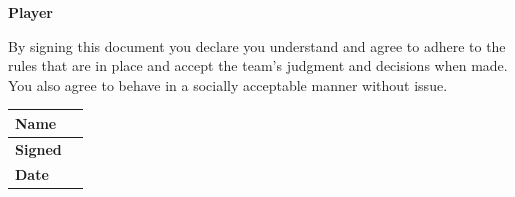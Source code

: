 \textbf{Player}

By signing this document you declare you understand and agree to adhere to the rules that are in place and accept the team's judgment and decisions when made. You also agree to behave in a socially acceptable manner without issue.

\begin{table}
\begin{tabular}{|l|l|} \hline 
\textbf{Name} &  \\
 \hline \textbf{Signed} &  \\
 \hline \textbf{Date} &  \\
 \hline \end{tabular}
\end{table}
